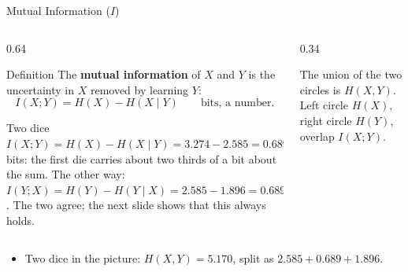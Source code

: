 \begin{frame}{Mutual Information ($I$)}
  \small
  \begin{columns}[T]
    \begin{column}{0.64\textwidth}
      \begin{block}{Definition}
        The \textbf{mutual information} of $X$ and $Y$ is the uncertainty in $X$ removed by learning $Y$:
        \[
          I(X;Y)=H(X)-H(X\mid Y)\qquad\text{bits, a number.}
        \]
      \end{block}
      \begin{exampleblock}{Two dice}
        $I(X;Y)=H(X)-H(X\mid Y)=3.274-2.585=0.689$ bits: the first die carries about two thirds of a bit about the sum.
        The other way: $I(Y;X)=H(Y)-H(Y\mid X)=2.585-1.896=0.689$. The two agree; the next slide shows that this always holds.
      \end{exampleblock}
    \end{column}
    \begin{column}{0.34\textwidth}
      \centering
      \par\smallskip
      {\footnotesize The union of the two circles is $H(X,Y)$. Left circle $H(X)$, right circle $H(Y)$, overlap $I(X;Y)$.}
    \end{column}
  \end{columns}
  \begin{itemize}
    \item Two dice in the picture: $H(X,Y)=5.170$, split as $2.585+0.689+1.896$.
  \end{itemize}
\end{frame}

